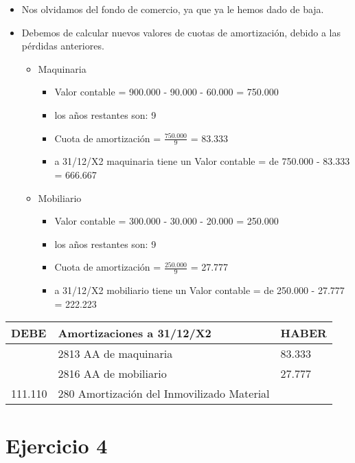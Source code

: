\documentclass[a4paper,12pt]{article}
\newcommand{\fec}{31/12/}
\newcommand{\VC}{Valor contable = }
\newcommand{\cuotaamort}{Cuota de amortización = }
\newcommand{\myequation}[2]{\ensuremath{\frac{#1}{#2}}}
\begin{document}
\begin{itemize}
    \item Nos olvidamos del fondo de comercio, ya que ya le hemos dado de baja.
    \item Debemos de calcular nuevos valores de cuotas de amortización, debido a las pérdidas anteriores.
    \begin{itemize}
        \item Maquinaria
        \begin{itemize}
            \item \VC 900.000 - 90.000 - 60.000 = 750.000
            \item los años restantes son: 9
            \item \cuotaamort \myequation{750.000}{9} = 83.333
            \item a \fec X2 maquinaria tiene un \VC de 750.000 - 83.333 = 666.667 
        \end{itemize}
        \item Mobiliario
        \begin{itemize}
            \item \VC 300.000 - 30.000 - 20.000 = 250.000
            \item los años restantes son: 9
            \item \cuotaamort \myequation{250.000}{9} = 27.777
            \item a \fec X2 mobiliario tiene un \VC de 250.000 - 27.777 = 222.223
        \end{itemize}
    \end{itemize}
\end{itemize}


\begin{table}[H]
    \centering
    \begin{tabular}{|p{3cm}|p{6cm}|p{3cm}|}
    \hline
    \textbf{DEBE} & \textbf{Amortizaciones a \fec X2} & \textbf{HABER} \\
    \hline
    & 2813 AA de maquinaria& 83.333\\
    \hline
    & 2816 AA de mobiliario& 27.777\\
    \hline
    111.110& 280 Amortización del Inmovilizado Material& \\
    \hline
    \end{tabular}
\end{table}

\section{Ejercicio 4}
\end{document}
